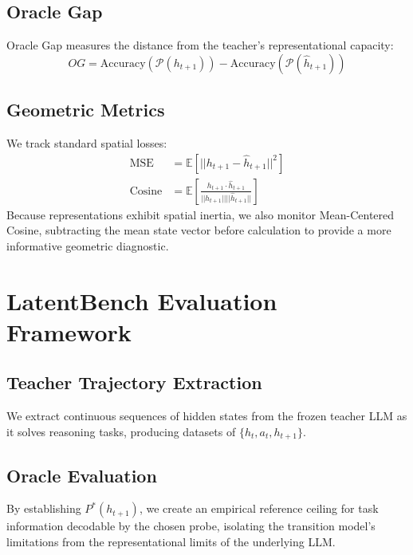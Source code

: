 \documentclass[conference]{IEEEtran}
\begin{document}
\subsection{Oracle Gap}
Oracle Gap measures the distance from the teacher's representational capacity:
\begin{equation}
OG = \text{Accuracy}(\mathcal{P}(h_{t+1})) - \text{Accuracy}(\mathcal{P}(\hat h_{t+1}))
\end{equation}

\subsection{Geometric Metrics}
We track standard spatial losses:
\begin{align}
\operatorname{MSE} &= \mathbb{E}[||h_{t+1} - \hat h_{t+1}||^2] \\
\operatorname{Cosine} &= \mathbb{E}\left[\frac{h_{t+1} \cdot \hat h_{t+1}}{||h_{t+1}|| ||\hat h_{t+1}||}\right]
\end{align}
Because representations exhibit spatial inertia, we also monitor Mean-Centered Cosine, subtracting the mean state vector before calculation to provide a more informative geometric diagnostic.

\section{LatentBench Evaluation Framework}

\subsection{Teacher Trajectory Extraction}
We extract continuous sequences of hidden states from the frozen teacher LLM as it solves reasoning tasks, producing datasets of $\{h_t, a_t, h_{t+1}\}$.

\subsection{Oracle Evaluation}
By establishing $P^*(h_{t+1})$, we create an empirical reference ceiling for task information decodable by the chosen probe, isolating the transition model's limitations from the representational limits of the underlying LLM.
\end{document}
